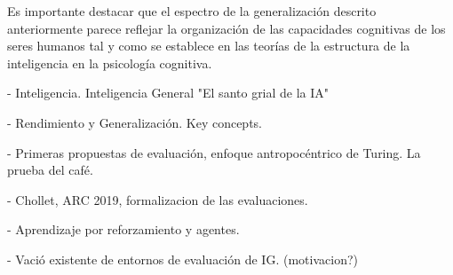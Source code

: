 Es importante destacar que el espectro de la generalización descrito anteriormente parece reflejar la organización de las capacidades cognitivas de los seres humanos tal y como se establece en las teorías de la estructura de la inteligencia en la psicología cognitiva.



- Inteligencia. Inteligencia General "El santo grial de la IA"

- Rendimiento y Generalización. Key concepts.

- Primeras propuestas de evaluación, enfoque antropocéntrico de Turing. La prueba del café.

- Chollet, ARC 2019, formalizacion de las evaluaciones.

- Aprendizaje por reforzamiento y agentes.

- Vació existente de entornos de evaluación de IG. (motivacion?)
